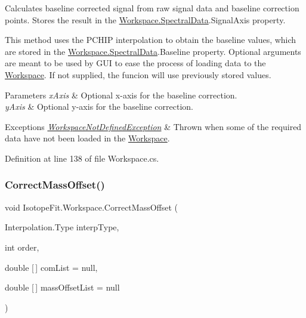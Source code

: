 Calculates baseline corrected signal from raw signal data and baseline correction points. Stores the result in the \hyperlink{class_isotope_fit_1_1_workspace_a1d6cc2dd07cbfe920da9f1bffc9b32c2}{Workspace.\+Spectral\+Data}.Signal\+Axis property. 

This method uses the P\+C\+H\+IP interpolation to obtain the baseline values, which are stored in the \hyperlink{class_isotope_fit_1_1_workspace_a1d6cc2dd07cbfe920da9f1bffc9b32c2}{Workspace.\+Spectral\+Data}.Baseline property. Optional arguments are meant to be used by G\+UI to ease the process of loading data to the \hyperlink{class_isotope_fit_1_1_workspace}{Workspace}. If not supplied, the funcion will use previously stored values. 


\begin{DoxyParams}{Parameters}
{\em x\+Axis} & Optional x-\/axis for the baseline correction.\\
\hline
{\em y\+Axis} & Optional y-\/axis for the baseline correction.\\
\hline
\end{DoxyParams}

\begin{DoxyExceptions}{Exceptions}
{\em \hyperlink{class_isotope_fit_1_1_workspace_not_defined_exception}{Workspace\+Not\+Defined\+Exception}} & Thrown when some of the required data have not been loaded in the \hyperlink{class_isotope_fit_1_1_workspace}{Workspace}.\\
\hline
\end{DoxyExceptions}


Definition at line 138 of file Workspace.\+cs.

\mbox{\label{class_isotope_fit_1_1_workspace_afcb232ba4ab41a8809afdb8c1c3844f3}} 
\subsubsection{\texorpdfstring{Correct\+Mass\+Offset()}{CorrectMassOffset()}}
{\footnotesize\ttfamily void Isotope\+Fit.\+Workspace.\+Correct\+Mass\+Offset (\begin{DoxyParamCaption}\item[{Interpolation.\+Type}]{interp\+Type,  }\item[{int}]{order,  }\item[{double \mbox{[}$\,$\mbox{]}}]{com\+List = {\ttfamily null},  }\item[{double \mbox{[}$\,$\mbox{]}}]{mass\+Offset\+List = {\ttfamily null} }\end{DoxyParamCaption})}



